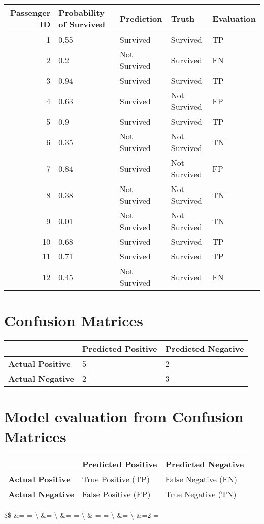 \documentclass[
]{article}
\begin{document}
\begin{longtable}[]{@{}rllll@{}}
\toprule
Passenger ID & Probability of Survived & Prediction & Truth &
Evaluation\tabularnewline
\midrule
\endhead
1 & 0.55 & Survived & Survived & TP\tabularnewline
2 & 0.2 & Not Survived & Survived & FN\tabularnewline
3 & 0.94 & Survived & Survived & TP\tabularnewline
4 & 0.63 & Survived & Not Survived & FP\tabularnewline
5 & 0.9 & Survived & Survived & TP\tabularnewline
6 & 0.35 & Not Survived & Not Survived & TN\tabularnewline
7 & 0.84 & Survived & Not Survived & FP\tabularnewline
8 & 0.38 & Not Survived & Not Survived & TN\tabularnewline
9 & 0.01 & Not Survived & Not Survived & TN\tabularnewline
10 & 0.68 & Survived & Survived & TP\tabularnewline
11 & 0.71 & Survived & Survived & TP\tabularnewline
12 & 0.45 & Not Survived & Survived & FN\tabularnewline
\bottomrule
\end{longtable}

\hypertarget{confusion-matrices-2}{%
\section{Confusion Matrices}\label{confusion-matrices-2}}

\begin{longtable}[]{@{}lll@{}}
\toprule
& Predicted Positive & Predicted Negative\tabularnewline
\midrule
\endhead
\textbf{Actual Positive} & 5 & 2\tabularnewline
\textbf{Actual Negative} & 2 & 3\tabularnewline
\bottomrule
\end{longtable}

\hypertarget{model-evaluation-from-confusion-matrices}{%
\section{Model evaluation from Confusion
Matrices}\label{model-evaluation-from-confusion-matrices}}

\begin{longtable}[]{@{}lll@{}}
\toprule
& Predicted Positive & Predicted Negative\tabularnewline
\midrule
\endhead
\textbf{Actual Positive} & True Positive (TP) & False Negative
(FN)\tabularnewline
\textbf{Actual Negative} & False Positive (FP) & True Negative
(TN)\tabularnewline
\bottomrule
\end{longtable}

\$\$  \&=  =
 \textbackslash{}  \&=
 \textbackslash{}  \&=
 =  \textbackslash{}
 \& =  =
 \textbackslash{}  \&= 
\textbackslash{} 
\&=2\cdot  {}
= 
\end{document}
